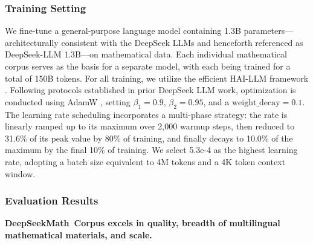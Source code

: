 \begin{itemize}[topsep=0pt]
\subsubsection{Training Setting}
\label{sec:quality-policy}
We fine-tune a general-purpose language model containing 1.3B parameters—architecturally consistent with the DeepSeek LLMs \citep{deepseek-llm} and henceforth referenced as DeepSeek-LLM 1.3B—on mathematical data. Each individual mathematical corpus serves as the basis for a separate model, with each being trained for a total of 150B tokens. For all training, we utilize the efficient HAI-LLM framework \citep{haillm}. Following protocols established in prior DeepSeek LLM work, optimization is conducted using AdamW \citep{adamW}, setting $\beta_1=0.9$, $\beta_2=0.95$, and a $\mathrm{weight\_decay}=0.1$. The learning rate scheduling incorporates a multi-phase strategy: the rate is linearly ramped up to its maximum over 2{,}000 warmup steps, then reduced to 31.6\% of its peak value by 80\% of training, and finally decays to 10.0\% of the maximum by the final 10\% of training. We select 5.3e-4 as the highest learning rate, adopting a batch size equivalent to 4M tokens and a 4K token context window.

\subsubsection{Evaluation Results}

\textbf{DeepSeekMath~Corpus excels in quality, breadth of multilingual mathematical materials, and scale.}


\end{itemize}
